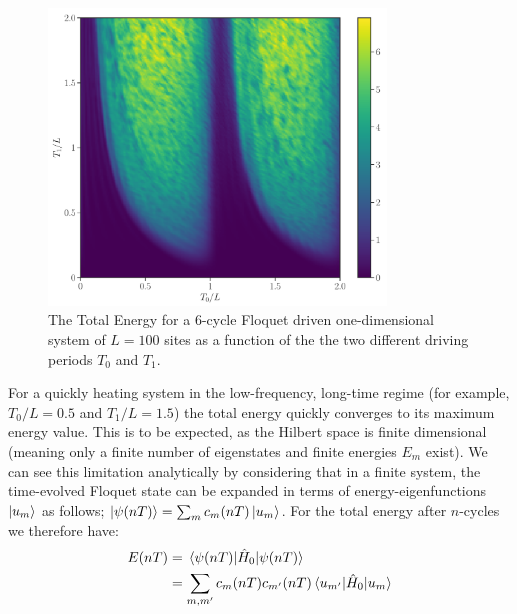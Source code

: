 \documentclass[11pt, a4paper, oneside]{book}
\theoremstyle{definition} %
\begin{document}
\begin{figure}[h]
	\centering
	\includegraphics[width=0.8\textwidth]{PhaseDiagram}
	\caption{The Total Energy for a 6-cycle Floquet driven one-dimensional system of $L = 100$ sites as a function of the the two different driving periods $T_0$ and $T_1$.}
	\label{fig:Phase_Diagram_Total_Energy}
\end{figure}
For a quickly heating system in the low-frequency, long-time regime (for example, $T_0/L = 0.5$ and $T_1/L = 1.5$) the total energy quickly converges to its maximum energy value. This is to be expected, as the Hilbert space is finite dimensional (meaning only a finite number of eigenstates and finite energies $E_m$ exist). We can see this limitation analytically by considering that in a finite system, the time-evolved Floquet state can be expanded in terms of energy-eigenfunctions $\ket{u_m}$ as follows; $\ket{\psi(nT)} = \sum_m c_m(nT) \ket{u_m}$. For the total energy after $n$-cycles we therefore have:
\begin{equation}
\begin{split}
	E(nT) &= \mel{\psi(nT)}{\hat{H}_0}{\psi(nT)} \\
	&= \sum_{m,m'} c_m(nT) c_{m'}(nT) \mel{u_{m'}}{\hat{H}_0}{u_m}
\end{split}
\end{equation}
\end{document}
